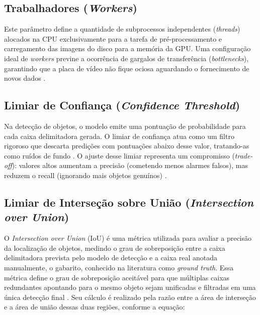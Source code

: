 \subsection{Trabalhadores (\textit{Workers})}

Este parâmetro define a quantidade de subprocessos independentes (\textit{threads}) alocados
na CPU exclusivamente para a tarefa de pré-processamento e carregamento das imagens do disco
para a memória da GPU. Uma configuração ideal de \textit{workers} previne a ocorrência de
gargalos de transferência (\textit{bottlenecks}), garantindo que a placa de vídeo não fique
ociosa aguardando o fornecimento de novos dados \cite{goodfellow2016deep}.

\subsection{Limiar de Confiança (\textit{Confidence Threshold})}

Na detecção de objetos, o modelo emite uma pontuação de probabilidade para cada caixa
delimitadora gerada. O limiar de confiança atua como um filtro rigoroso que descarta predições
com pontuações abaixo desse valor, tratando-as como ruídos de fundo
\cite{redmon2016yolo}. O ajuste desse limiar representa um compromisso (\textit{trade-off}):
valores altos aumentam a precisão (cometendo menos alarmes falsos), mas reduzem o recall
(ignorando mais objetos genuínos) \cite{redmon2016yolo}.

\subsection[Limiar de Interseção sobre União]{Limiar de Interseção sobre União (\textit{Intersection over Union})}

O \textit{Intersection over Union} (IoU) é uma métrica utilizada para avaliar a precisão da
localização de objetos, medindo o grau de sobreposição entre a caixa delimitadora prevista
pelo modelo de detecção e a caixa real anotada manualmente, o gabarito, conhecido na
literatura como \textit{ground truth}. Essa métrica define o grau de sobreposição aceitável
para que múltiplas caixas redundantes apontando para o mesmo objeto sejam unificadas e
filtradas em uma única detecção final \cite{ren2017faster}. Seu cálculo é realizado pela razão
entre a área de interseção e a área de união dessas duas regiões, conforme a equação:

